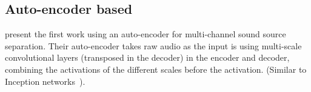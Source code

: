\subsection{Auto-encoder based}
\textcite{graisRaw2018} present the first work using an auto-encoder for multi-channel sound source separation. Their auto-encoder takes raw audio as the input is using multi-scale convolutional layers (transposed in the decoder) in the encoder and decoder, combining the activations of the different scales before the activation. (Similar to Inception networks~\cite{szegedyGoing2014}).
